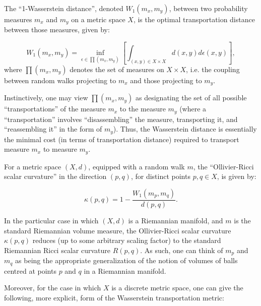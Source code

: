 \documentclass{article}
\begin{document}
\begin{definition}
The ``1-Wasserstein distance'', denoted ${W_1 \left( m_x, m_y \right)}$, between two probability measures ${m_x}$ and ${m_y}$ on a metric space $X$, is the optimal transportation distance between those measures, given by:

\begin{equation}
W_1 \left( m_x, m_y \right) = \inf_{\epsilon \in \prod \left( m_x, m_y \right)} \left[ \int_{\left( x, y \right) \in X \times X} d \left( x, y \right) d \epsilon \left( x, y \right) \right],
\end{equation}
where ${\prod \left( m_x, m_y \right)}$ denotes the set of measures on ${X \times X}$, i.e. the coupling between random walks projecting to ${m_x}$ and those projecting to ${m_y}$.
\end{definition}
Instinctively, one may view ${\prod \left( m_x, m_y \right)}$ as designating the set of all possible ``transportations'' of the measure ${m_x}$ to the measure ${m_y}$ (where a ``transportation'' involves ``disassembling'' the measure, transporting it, and ``reassembling it'' in the form of ${m_y}$). Thus, the Wasserstein distance is essentially the minimal cost (in terms of transportation distance) required to transport measure ${m_x}$ to measure ${m_y}$.

\begin{definition}
For a metric space ${\left( X, d \right)}$, equipped with a random walk $m$, the ``Ollivier-Ricci scalar curvature'' in the direction ${\left( p, q \right)}$, for distinct points ${p, q \in X}$, is given by:

\begin{equation}
\kappa \left( p, q \right) = 1 - \frac{W_1 \left( m_p, m_q \right)}{d \left( p, q \right)}.
\end{equation}
\end{definition}
In the particular case in which ${\left( X, d \right)}$ is a Riemannian manifold, and $m$ is the standard Riemannian volume measure, the Ollivier-Ricci scalar curvature ${\kappa \left( p, q \right)}$ reduces (up to some arbitrary scaling factor) to the standard Riemannian Ricci scalar curvature ${R \left( p, q \right)}$. As such, one can think of ${m_p}$ and ${m_q}$ as being the appropriate generalization of the notion of volumes of balls centred at points $p$ and $q$ in a Riemannian manifold.

Moreover, for the case in which $X$ is a discrete metric space, one can give the following, more explicit, form of the Wasserstein transportation metric:
\end{document}
